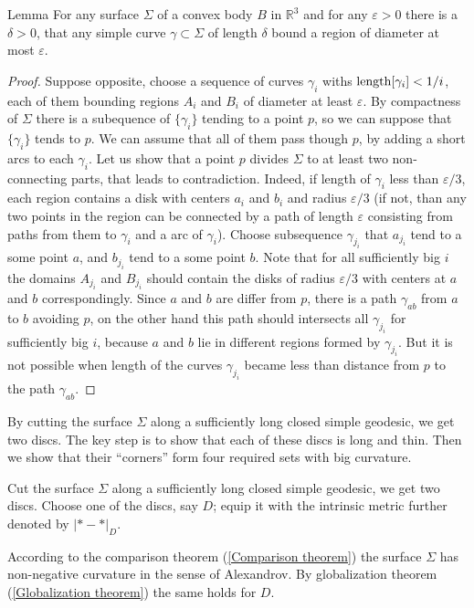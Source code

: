 \documentclass[oneside,a4paper, 12pt]{article}
\begin{document}
\begin{thm}{Lemma} 
For any surface $\Sigma$ of a convex body $B$ in $\mathbb{R}^3$ and for any $\varepsilon>0$ there is a $\delta>0$, that any simple curve $\gamma \subset \Sigma$ of length $\delta$ bound a region of diameter at most $\varepsilon$.
\end{thm}
\begin{proof}
	Suppose opposite, choose a sequence of curves $\gamma_i$ withs $\mathop{\rm length}\nolimits[\gamma_i]<1/i$, each of them bounding regions $A_i$ and $B_i$ of diameter at least $\varepsilon$. 
	By compactness of $\Sigma$ there is a subequence of $\{\gamma_i\}$ tending to a point $p$, so we can suppose that $\{\gamma_i\}$ tends to $p$. We can assume that all of them pass though $p$, by adding a short arcs to each $\gamma_i$.
	Let us show that a point $p$ divides $\Sigma$ to at least two non-connecting parts, that leads to contradiction.
Indeed, if length of $\gamma_i$ less than $\varepsilon/3$, each region contains a disk with centers $a_i$ and $b_i$ and radius $\varepsilon/3$ (if not, than any two points in the region can be connected by a path of length $\varepsilon$ consisting from paths from them to $\gamma_i$ and a arc of $\gamma_i$).
Choose subsequence $\gamma_{j_i}$ that $a_{j_i}$ tend to a some point $a$, and $b_{j_i}$ tend to a some point $b$.
Note that for all sufficiently big $i$ the domains $A_{j_i}$ and $B_{j_i}$ should contain the disks of radius $\varepsilon/3$ with centers at $a$ and $b$ correspondingly.
Since $a$ and $b$ are differ from $p$, there is a path $\gamma_{ab}$ from $a$ to $b$ avoiding $p$, on the other hand this path should intersects all $\gamma_{j_i}$ for sufficiently big $i$, because $a$ and $b$ lie in different regions formed by $\gamma_{j_i}$.
But it is not possible when length of the curves $\gamma_{j_i}$ became less than distance from $p$ to the path $\gamma_{ab}$.	
\end{proof}

By cutting the surface $\Sigma$ along a sufficiently long closed simple geodesic,
we get two discs.
The key step is to show that each of these discs is long and thin.
Then we show that their ``corners'' form four required sets with big curvature.

Cut the surface $\Sigma$ along a sufficiently long closed simple geodesic,
we get two discs.
Choose one of the discs, say $D$;
equip it with the intrinsic metric further denoted by $|{*}-{*}|_D$.


According to the comparison theorem (\ref{Comparison theorem}) the surface $\Sigma$ has non-negative curvature in the sense of Alexandrov.
By globalization theorem (\ref{Globalization theorem})
the same holds for $D$.
\end{document}
